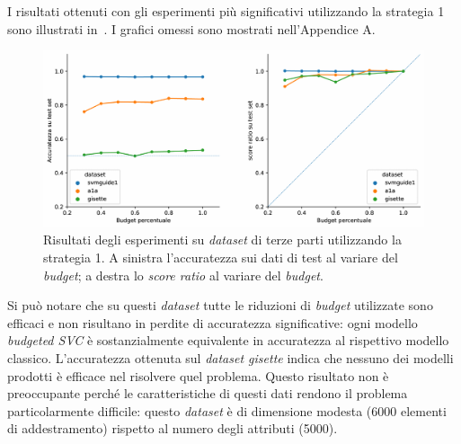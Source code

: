 I risultati ottenuti con gli esperimenti più significativi utilizzando la strategia 1 sono illustrati in~. I grafici omessi sono mostrati nell'Appendice A.
\begin{figure}
    \centering
    \includegraphics[width=1\linewidth]{img//TP/tp_old_strategy.pdf}
    \caption[Risultati degli esperimenti su \emph{dataset} di terze parti utilizzando la strategia 1.]{Risultati degli esperimenti su \emph{dataset} di terze parti utilizzando la strategia 1. A sinistra l'accuratezza sui dati di test al variare del \emph{budget}; a destra lo \emph{score ratio} al variare del \emph{budget}.}
    \label{fig:TP_old_strategy}
\end{figure}
Si può notare che su questi \emph{dataset} tutte le riduzioni di \emph{budget} utilizzate sono efficaci e non risultano in perdite di accuratezza significative: ogni modello \emph{budgeted SVC} è sostanzialmente equivalente in accuratezza al rispettivo modello classico.
L'accuratezza ottenuta sul \emph{dataset gisette} indica che nessuno dei modelli prodotti è efficace nel risolvere quel problema. Questo risultato non è preoccupante perché le caratteristiche di questi dati rendono il problema particolarmente difficile: questo \emph{dataset} è di dimensione modesta (6000 elementi di addestramento) rispetto al numero degli attributi (5000).

